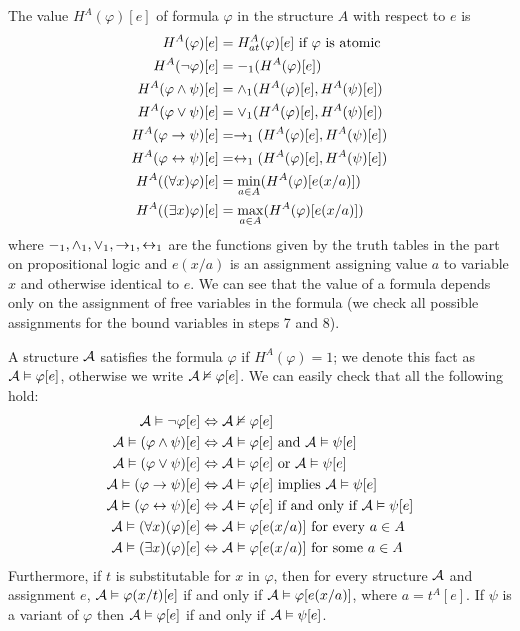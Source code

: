 The value $H^A(\varphi)[e]$ of formula $\varphi$ in the structure $A$ with respect to $e$ is 
\begin{align*}
	H^A(\varphi)[e] & = H^A_{at}(\varphi)[e] \text{ if } \varphi \text{ is atomic} \\
	H^A(\neg \varphi)[e] & = -_1(H^A(\varphi)[e])\\
	H^A(\varphi \land \psi)[e] & = \land_1(H^A(\varphi)[e], H^A(\psi)[e])\\
	H^A(\varphi \lor \psi)[e] & = \lor_1(H^A(\varphi)[e], H^A(\psi)[e])\\
	H^A(\varphi \to \psi)[e] & = \to_1(H^A(\varphi)[e], H^A(\psi)[e])\\
	H^A(\varphi \leftrightarrow \psi)[e] & = \leftrightarrow_1(H^A(\varphi)[e], H^A(\psi)[e])\\
	H^A((\forall x)\varphi)[e] & = \min_{a \in A}(H^A(\varphi)[e(x/a)])\\
	H^A((\exists x)\varphi)[e] & = \max_{a \in A}(H^A(\varphi)[e(x/a)])
\end{align*}
where $-_1, \land_1, \lor_1, \to_1, \leftrightarrow_1$ are the functions given by the truth tables in the part on propositional logic and $e(x/a)$ is an assignment  assigning value $a$ to variable $x$ and otherwise identical to $e$. We can see that the value of a formula depends only on the assignment of free variables in the formula (we check all possible assignments for the bound variables in steps 7 and 8).

A structure $\mathcal{A}$ satisfies the formula $\varphi$ if $H^A(\varphi) = 1$; we denote this fact as $\mathcal{A} \vDash \varphi[e]$, otherwise we write $\mathcal{A} \nvDash \varphi[e]$. We can easily check that all the following hold:
\begin{align*}
\mathcal{A} \vDash \neg \varphi[e] & \Leftrightarrow \mathcal{A} \nvDash \varphi[e] \\
\mathcal{A} \vDash (\varphi \land \psi)[e] & \Leftrightarrow \mathcal{A} \vDash \varphi[e] \text{ and } \mathcal{A} \vDash \psi[e]\\
\mathcal{A} \vDash (\varphi \lor \psi)[e] & \Leftrightarrow \mathcal{A} \vDash \varphi[e] \text{ or } \mathcal{A} \vDash \psi[e]\\ 
\mathcal{A} \vDash (\varphi \to \psi)[e] & \Leftrightarrow \mathcal{A} \vDash \varphi[e] \text{ implies } \mathcal{A} \vDash \psi[e]\\
\mathcal{A} \vDash (\varphi \leftrightarrow \psi)[e] & \Leftrightarrow \mathcal{A} \vDash \varphi[e] \text{ if and only if } \mathcal{A} \vDash \psi[e]\\
\mathcal{A} \vDash (\forall x)(\varphi)[e] & \Leftrightarrow \mathcal{A} \vDash \varphi[e(x/a)] \text{ for every } a \in A \\
\mathcal{A} \vDash (\exists x)(\varphi)[e] & \Leftrightarrow \mathcal{A} \vDash \varphi[e(x/a)] \text{ for some } a \in A
\end{align*}
Furthermore, if $t$ is substitutable for $x$ in $\varphi$, then for every structure $\mathcal{A}$ and assignment $e$, $\mathcal{A} \vDash \varphi(x/t)[e]$ if and only if $\mathcal{A} \vDash \varphi[e(x/a)]$, where $a = t^A[e]$. If $\psi$ is a variant of $\varphi$ then $\mathcal{A} \vDash \varphi[e]$ if and only if $\mathcal{A} \vDash \psi[e]$.

